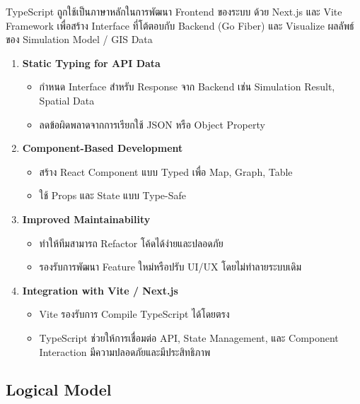 TypeScript ถูกใช้เป็นภาษาหลักในการพัฒนา Frontend ของระบบ ด้วย Next.js และ Vite Framework เพื่อสร้าง Interface ที่โต้ตอบกับ Backend (Go Fiber) และ Visualize ผลลัพธ์ของ Simulation Model / GIS Data
\begin{enumerate}
    \item \textbf{Static Typing for API Data}
    \begin{itemize}
        \item กำหนด Interface สำหรับ Response จาก Backend เช่น Simulation Result, Spatial Data
        \item ลดข้อผิดพลาดจากการเรียกใช้ JSON หรือ Object Property
    \end{itemize}
    
    \item \textbf{Component-Based Development}
    \begin{itemize}
        \item สร้าง React Component แบบ Typed เพื่อ Map, Graph, Table
        \item ใช้ Props และ State แบบ Type-Safe
    \end{itemize}
    
    \item \textbf{Improved Maintainability}
    \begin{itemize}
        \item ทำให้ทีมสามารถ Refactor โค้ดได้ง่ายและปลอดภัย
        \item รองรับการพัฒนา Feature ใหม่หรือปรับ UI/UX โดยไม่ทำลายระบบเดิม
    \end{itemize}
    
    \item \textbf{Integration with Vite / Next.js}
    \begin{itemize}
        \item Vite รองรับการ Compile TypeScript ได้โดยตรง
        \item TypeScript ช่วยให้การเชื่อมต่อ API, State Management, และ Component Interaction มีความปลอดภัยและมีประสิทธิภาพ
    \end{itemize}
\end{enumerate}

\subsection{Logical Model}
